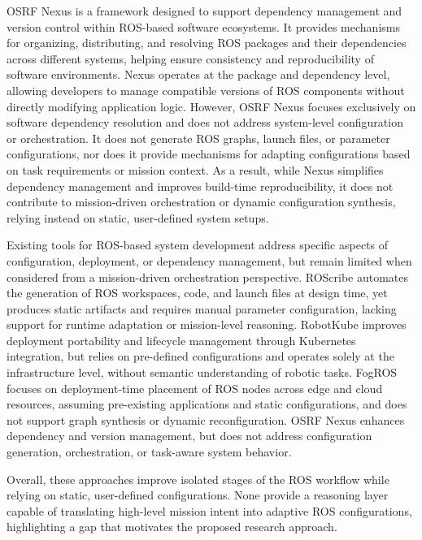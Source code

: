 OSRF Nexus \cite{osrfnexus} is a framework designed to support dependency management and version control within 
ROS-based software ecosystems. It provides mechanisms for organizing, distributing, and resolving
ROS packages and their dependencies across different systems, helping ensure consistency and 
reproducibility of software environments. Nexus operates at the package and dependency level, allowing
developers to manage compatible versions of ROS components without directly modifying application
logic. However, OSRF Nexus focuses exclusively on software dependency resolution 
and does not address system-level configuration or orchestration. It does not generate ROS graphs,
launch files, or parameter configurations, nor does it provide mechanisms for adapting configurations
based on task requirements or mission context. As a result, while Nexus simplifies dependency management
and improves build-time reproducibility, it does not contribute to mission-driven orchestration or 
dynamic configuration synthesis, relying instead on static, user-defined system setups.

Existing tools for ROS-based system development address specific aspects of configuration, 
deployment, or dependency management, but remain limited when considered from a mission-driven
orchestration perspective. ROScribe automates the generation of ROS workspaces, code, and launch 
files at design time, yet produces static artifacts and requires manual parameter configuration, 
lacking support for runtime adaptation or mission-level reasoning. RobotKube improves deployment 
portability and lifecycle management through Kubernetes integration, but relies on pre-defined 
configurations and operates solely at the infrastructure level, without semantic understanding 
of robotic tasks. FogROS focuses on deployment-time placement of ROS nodes across edge and cloud 
resources, assuming pre-existing applications and static configurations, and does not support 
graph synthesis or dynamic reconfiguration. OSRF Nexus enhances dependency and version management,
but does not address configuration generation, orchestration, or task-aware system behavior.

Overall, these approaches improve isolated stages of the ROS workflow while relying on static, 
user-defined configurations. None provide a reasoning layer capable of translating high-level mission
intent into adaptive ROS configurations, highlighting a gap that motivates the proposed research approach.

